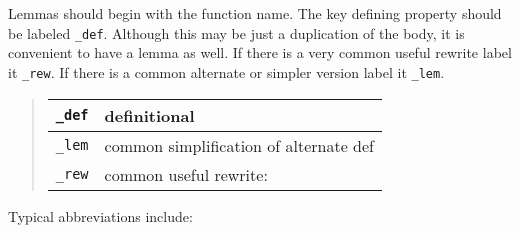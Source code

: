 \documentclass[12pt]{article}
\begin{document}
Lemmas should begin with the function name.  The key defining property
should be labeled \verb|_def|.  Although this may be just a duplication
of the body, it is convenient to have a lemma as well.  If there is a 
very common useful rewrite label it \verb|_rew|.  If there is a common
alternate or simpler version label it \verb|_lem|.
\begin{quote}
\begin{tabular}{|l|p{4.0in}|} \hline\hline
\verb|_def|   & definitional  \\ \hline
\verb|_lem|   & common simplification of alternate def \\ \hline
\verb|_rew|   & common useful rewrite: \\ \hline
\hline
\end{tabular}
\end{quote}
Typical abbreviations include:
\end{document}
